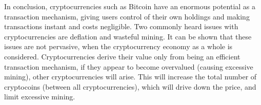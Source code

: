 \documentclass[12pt]{article}\usepackage[]{graphicx}\usepackage[]{color}
\begin{document}
In conclusion, cryptocurrencies such as Bitcoin have an enormous potential as a transaction mechanism,
giving users control of their own holdings and making transactions instant and costs negligible.
Two commonly heard issues with cryptocurrencies are deflation and wasteful mining.
It can be shown that these issues are not pervasive,
when the cryptocurrency economy as a whole is considered.
Cryptocurrencies derive their value only from being an efficient transaction mechanism,
if they appear to become overvalued (causing excessive mining), other cryptocurrencies will arise.
This will increase the total number of cryptocoins (between all cryptocurrencies),
which will drive down the price, and limit excessive mining.

\printbibliography
\end{document}
